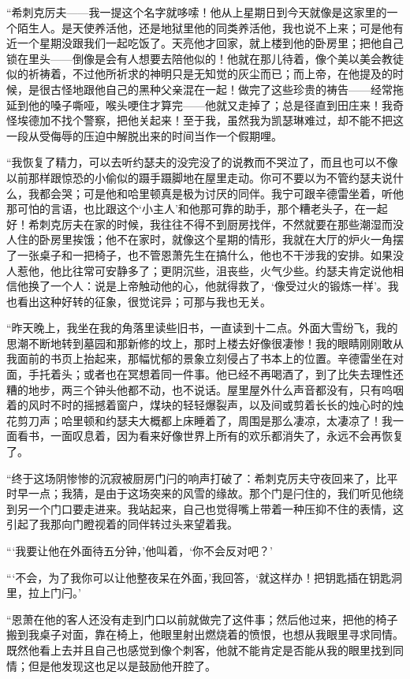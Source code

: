 \par “希刺克厉夫——我一提这个名字就哆嗦！他从上星期日到今天就像是这家里的一个陌生人。是天使养活他，还是地狱里他的同类养活他，我也说不上来；可是他有近一个星期没跟我们一起吃饭了。天亮他才回家，就上楼到他的卧房里；把他自己锁在里头——倒像是会有人想要去陪他似的！他就在那儿待着，像个美以美会教徒似的祈祷着，不过他所祈求的神明只是无知觉的灰尘而已；而上帝，在他提及的时候，是很古怪地跟他自己的黑种父亲混在一起！做完了这些珍贵的祷告——经常拖延到他的嗓子嘶哑，喉头哽住才算完——他就又走掉了；总是径直到田庄来！我奇怪埃德加不找个警察，把他关起来！至于我，虽然我为凯瑟琳难过，却不能不把这一段从受侮辱的压迫中解脱出来的时间当作一个假期哩。
\par “我恢复了精力，可以去听约瑟夫的没完没了的说教而不哭泣了，而且也可以不像以前那样跟惊恐的小偷似的蹑手蹑脚地在屋里走动。你可不要以为不管约瑟夫说什么，我都会哭；可是他和哈里顿真是极为讨厌的同伴。我宁可跟辛德雷坐着，听他那可怕的言语，也比跟这个‘小主人’和他那可靠的助手，那个糟老头子，在一起好！希刺克厉夫在家的时候，我往往不得不到厨房找伴，不然就要在那些潮湿而没人住的卧房里挨饿；他不在家时，就像这个星期的情形，我就在大厅的炉火一角摆了一张桌子和一把椅子，也不管恩萧先生在搞什么，他也不干涉我的安排。如果没人惹他，他比往常可安静多了；更阴沉些，沮丧些，火气少些。约瑟夫肯定说他相信他换了一个人：说是上帝触动他的心，他就得救了，‘像受过火的锻炼一样’。我也看出这种好转的征象，很觉诧异；可那与我也无关。
\par “昨天晚上，我坐在我的角落里读些旧书，一直读到十二点。外面大雪纷飞，我的思潮不断地转到墓园和那新修的坟上，那时上楼去好像很凄惨！我的眼睛刚刚敢从我面前的书页上抬起来，那幅忧郁的景象立刻侵占了书本上的位置。辛德雷坐在对面，手托着头；或者也在冥想着同一件事。他已经不再喝酒了，到了比失去理性还糟的地步，两三个钟头他都不动，也不说话。屋里屋外什么声音都没有，只有呜咽着的风时不时的摇撼着窗户，煤块的轻轻爆裂声，以及间或剪着长长的烛心时的烛花剪刀声；哈里顿和约瑟夫大概都上床睡着了，周围是那么凄凉，太凄凉了！我一面看书，一面叹息着，因为看来好像世界上所有的欢乐都消失了，永远不会再恢复了。
\par “终于这场阴惨惨的沉寂被厨房门闩的响声打破了：希刺克厉夫守夜回来了，比平时早一点；我猜，是由于这场突来的风雪的缘故。那个门是闩住的，我们听见他绕到另一个门口要走进来。我站起来，自己也觉得嘴上带着一种压抑不住的表情，这引起了我那向门瞪视着的同伴转过头来望着我。
\par “‘我要让他在外面待五分钟，’他叫着，‘你不会反对吧？’
\par “‘不会，为了我你可以让他整夜呆在外面，’我回答，‘就这样办！把钥匙插在钥匙洞里，拉上门闩。’
\par “恩萧在他的客人还没有走到门口以前就做完了这件事；然后他过来，把他的椅子搬到我桌子对面，靠在椅上，他眼里射出燃烧着的愤恨，也想从我眼里寻求同情。既然他看上去并且自己也感觉到像个刺客，他就不能肯定是否能从我的眼里找到同情；但是他发现这也足以是鼓励他开腔了。
